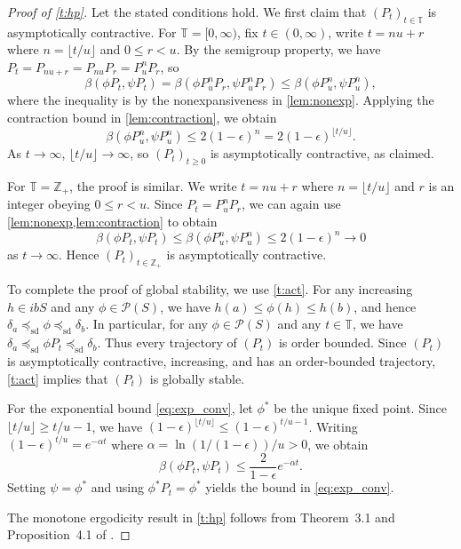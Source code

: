 \documentclass[12pt,reqno]{amsart}
\numberwithin{equation}{section}
\theoremstyle{definition}
\newcommand{\1}{\mathbbm{1}}
\newcommand{\ZZ}{\mathbb{Z}}
\newcommand{\TT}{\mathbb T}
\newcommand{\pP}{\mathscr{P}}
\newcommand{\precsd}{\preceq_{\textrm{sd}}}
\begin{document}
\begin{proof}[Proof of \cref{t:hp}]
    Let the stated conditions hold. We first claim that $(P_t)_{t \in \TT}$ is
    asymptotically contractive. For $\TT = [0, \infty)$, fix
    $t \in (0, \infty)$, write $t = nu + r$ where $n = \lfloor t/u \rfloor$ and
    $0 \leq r < u$. By the semigroup property, we have
    $P_t = P_{nu + r} = P_{nu} P_r = P_u^n P_r$, so
    \begin{equation*}
        \beta(\phi P_t, \psi P_t)
        = \beta(\phi P_u^n P_r, \psi P_u^n P_r)
        \leq \beta(\phi P_u^n, \psi P_u^n),
    \end{equation*}
    where the inequality is by the nonexpansiveness in \cref{lem:nonexp}.
    Applying the contraction bound in \cref{lem:contraction}, we obtain
    \begin{equation*}
        \beta(\phi P_u^n, \psi P_u^n)
        \leq 2(1-\epsilon)^n
        = 2(1-\epsilon)^{\lfloor t/u \rfloor}.
    \end{equation*}
    As $t \to \infty$, $\lfloor t/u \rfloor \to \infty$, so $(P_t)_{t \geq 0}$
    is asymptotically contractive, as claimed.

    For $\TT = \ZZ_+$, the proof is similar.  We write $t = nu + r$ where
    $n = \lfloor t/u \rfloor$ and $r$ is an integer obeying $0 \leq r < u$.
    Since $P_t = P_u^n P_r$, we can again use \cref{lem:nonexp,lem:contraction}
    to obtain
    \begin{equation*}
    \beta(\phi P_t, \psi P_t) \leq \beta(\phi P_u^n, \psi P_u^n) \leq 2(1-\epsilon)^n \to 0
    \end{equation*}
    as $t \to \infty$. Hence $(P_t)_{t \in \ZZ_+}$ is asymptotically contractive.

    To complete the proof of global stability, we use \cref{t:act}. For any
    increasing $h \in ibS$ and any $\phi \in \pP(S)$, we have $h(a) \leq \phi(h)
    \leq h(b)$, and hence $\delta_a \precsd \phi \precsd \delta_b$. In
    particular, for any $\phi \in \pP(S)$ and any $t \in \TT$, we have $\delta_a
    \precsd \phi P_t \precsd \delta_b$. Thus every trajectory of $(P_t)$ is
    order bounded. Since $(P_t)$ is asymptotically contractive, increasing, and
    has an order-bounded trajectory, \cref{t:act} implies that $(P_t)$ is
    globally stable.

    For the exponential bound \eqref{eq:exp_conv}, let $\phi^*$ be the unique
    fixed point. Since $\lfloor t/u \rfloor \geq t/u - 1$, we have
    $(1-\epsilon)^{\lfloor t/u \rfloor} \leq (1-\epsilon)^{t/u - 1}$.
    Writing $(1-\epsilon)^{t/u} = e^{-\alpha t}$ where $\alpha = \ln(1/(1-\epsilon))/u > 0$,
    we obtain
    \begin{equation*}
        \beta(\phi P_t, \psi P_t) \leq \frac{2}{1-\epsilon} e^{-\alpha t}.
    \end{equation*}
    Setting $\psi = \phi^*$ and using $\phi^* P_t = \phi^*$ yields the bound in
    \eqref{eq:exp_conv}.

    The monotone ergodicity result in \cref{t:hp} follows from Theorem~3.1 and
    Proposition~4.1 of \cite{kamihigashi2016seeking}.
\end{proof}
\end{document}

